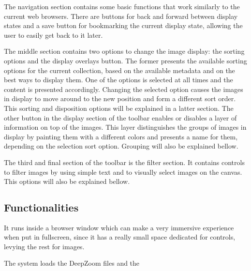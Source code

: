 The navigation section contains some basic functions that work similarly to the current web browsers. There are buttons for back and forward between display states and a save button for bookmarking the current display state, allowing the user to easily get back to it later.

The middle section contains two options to change the image display:  the sorting options and the display overlays button. The former presents the available sorting options for the current collection, based on the available metadata and on the best ways to display them. One of the options is selected at all times and the content is presented accordingly. Changing the selected option causes the images in display to move around to the new position and form a different sort order. This sorting and disposition options will be explained in a latter section.
The other button in the display section of the toolbar enables or disables a layer of information on top of the images. This layer distinguishes the groups of images in display by painting them with a different colors and presents a name for them, depending on the selection sort option. Grouping will also be explained bellow. 

The third and final section of the toolbar is the filter section. It contains controls to filter images by using simple text and to visually select images on the canvas. This options will also be explained bellow.



\subsection{Functionalities}





It runs inside a browser window which can make a very immersive experience when put in fullscreen, since it has a really small space dedicated for controls, levying the rest for images.


The system loads the DeepZoom files and the 


